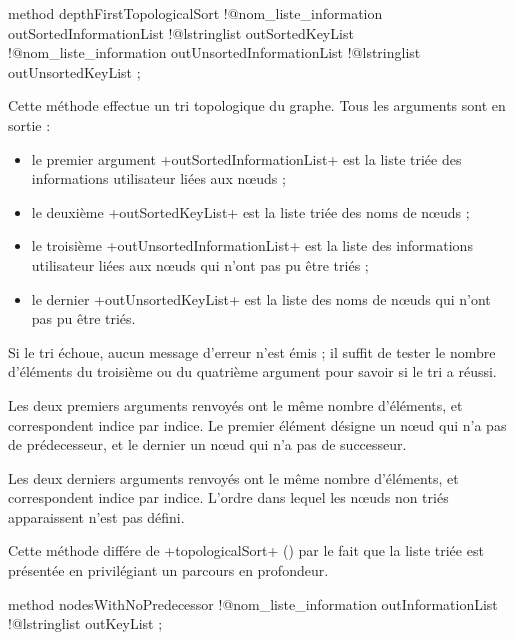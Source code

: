 
\begin{galgascode}
method depthFirstTopologicalSort
  !@nom_liste_information outSortedInformationList
  !@lstringlist outSortedKeyList
  !@nom_liste_information outUnsortedInformationList
  !@lstringlist outUnsortedKeyList
;
\end{galgascode}

Cette méthode effectue un tri topologique du graphe. Tous les arguments sont en sortie :
\begin{itemize}
  \item le premier argument \ggs+outSortedInformationList+ est la liste triée des informations utilisateur liées aux nœuds ;
  \item le deuxième \ggs+outSortedKeyList+ est la liste triée des noms de nœuds ;
  \item le troisième \ggs+outUnsortedInformationList+ est la liste des informations utilisateur liées aux nœuds qui n'ont pas pu être triés ;
  \item le dernier \ggs+outUnsortedKeyList+ est la liste des noms de nœuds qui n'ont pas pu être triés.
\end{itemize}

Si le tri échoue, aucun message d'erreur n'est émis ; il suffit de tester le nombre d'éléments du troisième ou du quatrième argument pour savoir si le tri a réussi.

Les deux premiers arguments renvoyés ont le même nombre d'éléments, et correspondent indice par indice. Le premier élément désigne un nœud qui n'a pas de prédecesseur, et le dernier un nœud qui n'a pas de successeur.


Les deux derniers arguments renvoyés ont le même nombre d'éléments, et correspondent indice par indice. L'ordre dans lequel les nœuds non triés apparaissent n'est pas défini.

Cette méthode différe de \ggs+topologicalSort+ () par le fait que la liste triée est présentée en privilégiant un parcours en profondeur.







\begin{galgascode}
method nodesWithNoPredecessor
  !@nom_liste_information outInformationList
  !@lstringlist outKeyList
;
\end{galgascode}

